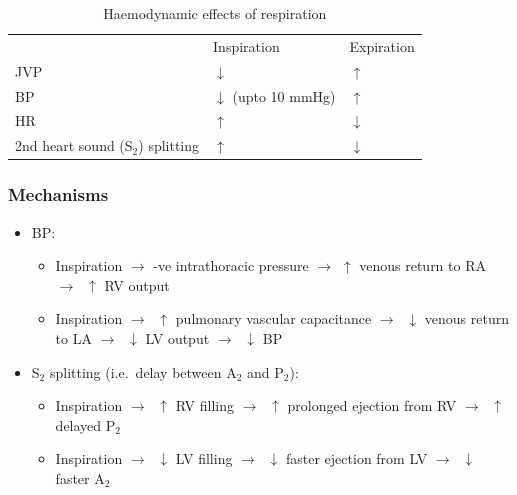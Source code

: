 \documentclass[
  12pt,
]{memoir}
\providecommand{\tightlist}{%
  \setlength{\itemsep}{0pt}\setlength{\parskip}{0pt}}
\begin{document}
\renewcommand{\arraystretch}{1.5}
\begin{table}[h!]
\centering
\begin{tabular}{|l|l|l|}
\hline
\cellcolor{violet!60}\color{white} &
\cellcolor{violet!60}\color{white}Inspiration &
\cellcolor{violet!60}\color{white}Expiration \\
JVP & $\downarrow$ & $\uparrow$ \\
BP & $\downarrow$ (upto 10 mmHg) & $\uparrow$ \\
HR & $\uparrow$ & $\downarrow$ \\
2nd heart sound (S$_2$) splitting & $\uparrow$ & $\downarrow$ \\
\hline
\end{tabular}
\vspace{3mm}\caption{Haemodynamic effects of respiration}
\label{table:haemo-resp.txt}
\end{table}

\hypertarget{mechanisms}{%
\subsubsection{Mechanisms}\label{mechanisms}}

\begin{itemize}
\tightlist
\item
  BP:

  \begin{itemize}
  \tightlist
  \item
    Inspiration \(\rightarrow\) -ve intrathoracic pressure
    \(\rightarrow\) \(\uparrow\) venous return to RA
    \(\rightarrow\;\;\uparrow\) RV output
  \item
    Inspiration \(\rightarrow\;\;\uparrow\) pulmonary vascular
    capacitance \(\rightarrow\;\;\downarrow\) venous return to LA
    \(\rightarrow\;\;  \downarrow\) LV output
    \(\rightarrow\;\;\downarrow\) BP
  \end{itemize}
\item
  S\(_2\) splitting (i.e.~delay between A\(_2\) and P\(_2\)):

  \begin{itemize}
  \tightlist
  \item
    Inspiration \(\rightarrow\;\;\uparrow\) RV filling
    \(\rightarrow\;\;  \uparrow\) prolonged ejection from RV
    \(\rightarrow\;\;\uparrow\) delayed P\(_2\)
  \item
    Inspiration \(\rightarrow\;\;\downarrow\) LV filling
    \(\rightarrow\;\;  \downarrow\) faster ejection from LV
    \(\rightarrow\;\;\downarrow\) faster A\(_2\)
  \end{itemize}
\end{itemize}
\end{document}
